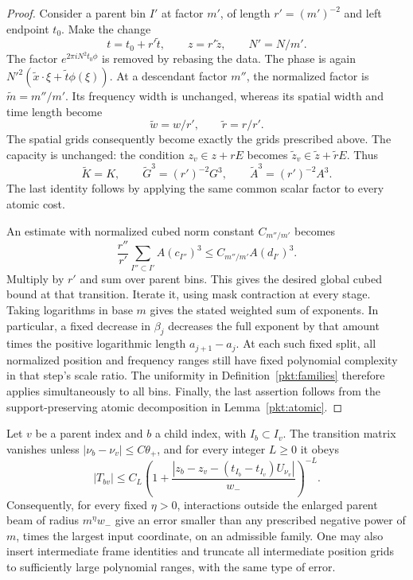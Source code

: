 \begin{proof}
Consider a parent bin $I'$ at factor $m'$, of length
$r'=(m')^{-2}$ and left endpoint $t_0$.  Make the change
\[
 t=t_0+r'\widetilde t,\qquad
 z=r'\widetilde z,\qquad N'=N/m'.
\]
The factor $e^{2\pi iN^2t_0\phi}$ is removed by rebasing the data.
The phase is again $N'^2(\widetilde x\cdot\xi+
\widetilde t\phi(\xi))$.  At a descendant factor $m''$, the normalized
factor is $\widetilde m=m''/m'$.  Its frequency width is unchanged,
whereas its spatial width and time length become
\[
 \widetilde w=w/r',\qquad \widetilde r=r/r'.
\]
The spatial grids consequently become exactly the grids prescribed
above.  The capacity is unchanged: the condition
$z_v\in z+rE$ becomes
$\widetilde z_v\in\widetilde z+\widetilde rE$.  Thus
\begin{equation}\label{pkt:normalization}
 \widetilde K=K,\qquad
 \widetilde G^3=(r')^{-2}G^3,\qquad
 \widetilde A^3=(r')^{-2}A^3.
\end{equation}
The last identity follows by applying the same common scalar factor
to every atomic cost.

An estimate with normalized cubed norm constant $C_{m''/m'}$ becomes
\[
 \frac{r''}{r'}\sum_{I''\subset I'}A(c_{I''})^3
       \le C_{m''/m'}A(d_{I'})^3.
\]
Multiply by $r'$ and sum over parent bins.  This gives the desired
global cubed bound at that transition.  Iterate it, using mask
contraction at every stage.  Taking logarithms in base $m$ gives the
stated weighted sum of exponents.  In particular, a fixed decrease in
$\beta_j$ decreases the full exponent by that amount times the positive
logarithmic length $a_{j+1}-a_j$.  At each such fixed split, all normalized
position and frequency ranges still have fixed polynomial complexity
in that step's scale ratio.  The uniformity in
Definition~\ref{pkt:families} therefore applies simultaneously to all
bins.  Finally, the last assertion follows from the support-preserving
atomic decomposition in Lemma~\ref{pkt:atomic}.
\end{proof}

\begin{lemma}\label{pkt:locality}
Let $v$ be a parent index and $b$ a child index, with $I_b\subset I_v$.
The transition matrix vanishes unless
$|\nu_b-\nu_v|\le C\theta_+$, and for every integer $L\ge0$ it obeys
\begin{equation}\label{pkt:matrix-decay}
 |T_{bv}|\le C_L
 \left(1+
  \frac{|z_b-z_v-(t_{I_b}-t_{I_v})U_{\nu_v}|}{w_-}
 \right)^{-L}.
\end{equation}
Consequently, for every fixed $\eta>0$, interactions outside the
enlarged parent beam of radius $m^\eta w_-$ give an error smaller than
any prescribed negative power of \(m\), times the largest input
coordinate, on an admissible family.  One may
also insert intermediate frame identities and truncate all intermediate
position grids to sufficiently large polynomial ranges, with the same
type of error.
\end{lemma}

